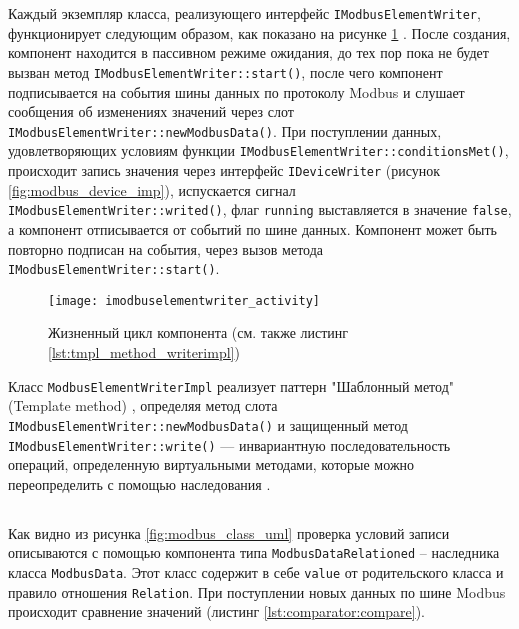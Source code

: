 Каждый экземпляр класса, реализующего интерфейс \texttt{IModbusElementWri\-ter},
функционирует следующим образом, как показано на рисунке \ref{fig:imodbuselementwriter_activity} \cite[стр. 217]{book:oop:oop_analize}.
После создания, компонент находится в пассивном режиме ожидания, до тех пор пока не будет вызван
метод \texttt{IModbusElementWriter::start()}, после чего компонент подписывается на события шины данных по протоколу Modbus
и слушает сообщения об изменениях значений через слот \texttt{IModbusElementWriter::newModbusData()}.
При поступлении данных, удовлетворяющих условиям функции \texttt{IModbusElementWriter::conditionsMet()},
происходит запись значения через интерфейс \texttt{IDeviceWriter} (рисунок \ref{fig:modbus_device_imp}),
испускается сигнал \texttt{IModbusElementWriter::writed()},
флаг \texttt{running} выставляется в значение \texttt{false},
а компонент отписывается от событий по шине данных.
Компонент может быть повторно подписан на события, через вызов метода \texttt{IModbusElementWriter::start()}.

\begin{center}
    \begin{figure}
        \texttt{[image: imodbuselementwriter\_activity]}
        \caption{Жизненный цикл компонента (см. также листинг \ref{lst:tmpl_method_writerimpl})}\label{fig:imodbuselementwriter_activity}
    \end{figure}
\end{center}


Класс \texttt{ModbusElementWriterImpl} реализует паттерн "Шаблонный метод" (Template method) \cite[стр. 309]{book:pattern:band_of_4},
определяя метод слота \texttt{IModbusElementWriter::newModbusData()}
и защищенный метод \texttt{IModbusElementWriter::write()} --- инвариантную последовательность операций,
определенную виртуальными методами, которые можно переопределить с помощью наследования \cite[стр. 170]{book:tdd:KentBeck}.




\subsection{}
Как видно из рисунка \ref{fig:modbus_class_uml} проверка условий записи описываются с помощью компонента типа
\texttt{ModbusDataRelationed} -- наследника класса \texttt{ModbusData}.
Этот класс содержит в себе \texttt{value} от родительского класса и правило отношения \texttt{Relation}.
При поступлении новых данных по шине Modbus происходит сравнение значений (листинг \ref{lst:comparator:compare}).



